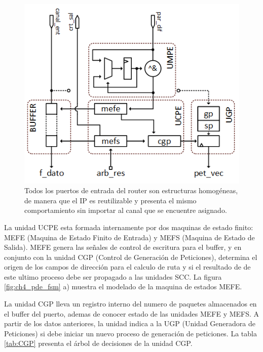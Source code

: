 \begin{figure}
	\begin{center}
		\includegraphics[scale=0.8]{figures/ch4_puerto_entrada.png}
	\end{center}
	\caption
		{	
			Todos los puertos de entrada del router son estructuras homogéneas, de manera que el IP es reutilizable y presenta el mismo comportamiento sin importar al canal que se encuentre asignado.
		}
	\label{fig:ch4_puerto_entrada}
\end{figure}

La unidad UCPE esta formada internamente por dos maquinas de estado finito: MEFE (Maquina de Estado Finito de Entrada) y MEFS (Maquina de Estado de Salida). MEFE genera las señales de control de escritura para el buffer, y en conjunto con la unidad CGP (Control de Generación de Peticiones), determina el origen de los campos de dirección para el calculo de ruta y si el resultado de de este ultimo proceso debe ser propagado a las unidades SCC. La figura \ref{fig:ch4_pde_fsm} a) muestra el modelado de la maquina de estados MEFE.

La unidad CGP lleva un registro interno del numero de paquetes almacenados en el buffer del puerto, ademas de conocer estado de las unidades MEFE y MEFS. A partir de los datos anteriores, la unidad indica a la UGP (Unidad Generadora de Peticiones) si debe iniciar un nuevo proceso de generación de peticiones. La tabla \ref{tab:CGP} presenta el árbol de decisiones de la unidad CGP.

